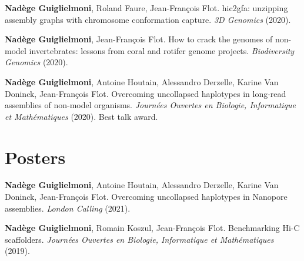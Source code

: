 \textbf{Nadège Guiglielmoni}, Roland Faure, Jean-François Flot. hic2gfa:  unzipping assembly graphs with chromosome conformation capture. \textit{3D Genomics} (2020).

\textbf{Nadège Guiglielmoni}, Jean-François Flot. How to crack the genomes of non-model invertebrates: lessons from coral and rotifer genome projects. \textit{Biodiversity Genomics} (2020). 

\textbf{Nadège Guiglielmoni}, Antoine Houtain, Alessandro Derzelle, Karine Van Doninck, Jean-François Flot. Overcoming uncollapsed haplotypes in long-read assemblies of non-model organisms. \textit{Journées Ouvertes en Biologie, Informatique et Mathématiques} (2020). Best talk award.

\section*{Posters}

\textbf{Nadège Guiglielmoni}, Antoine Houtain, Alessandro Derzelle, Karine Van Doninck, Jean-François Flot. Overcoming uncollapsed haplotypes in Nanopore assemblies. \textit{London Calling} (2021).

\textbf{Nadège Guiglielmoni}, Romain Koszul, Jean-François Flot. Benchmarking Hi-C scaffolders. \textit{Journées Ouvertes en Biologie, Informatique et Mathématiques} (2019). 